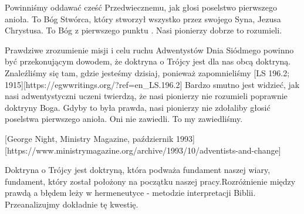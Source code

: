 Powinniśmy oddawać cześć Przedwiecznemu, jak głosi poselstwo pierwszego anioła. To Bóg Stwórca, który stworzył wszystko przez swojego Syna, Jezusa Chrystusa. To Bóg z pierwszego punktu . Nasi pionierzy dobrze to rozumieli.

Prawdziwe zrozumienie misji i celu ruchu Adwentystów Dnia Siódmego powinno być przekonującym dowodem, że doktryna o Trójcy jest dla nas obcą doktryną. Znaleźliśmy się tam, gdzie jesteśmy dzisiaj, ponieważ zapomnieliśmy [LS 196.2; 1915][https://egwwritings.org/?ref=en\_LS.196.2] Bardzo smutno jest widzieć, jak nasi adwentystyczni uczeni twierdzą, że nasi pionierzy nie rozumieli poprawnie doktryny Boga. Gdyby to była prawda, nasi pionierzy nie zdołaliby głosić poselstwa pierwszego anioła. Oni nie zawiedli. To my zawiedliśmy.

[George Night, Ministry Magazine, październik 1993][https://www.ministrymagazine.org/archive/1993/10/adventists-and-change]

Doktryna o Trójcy jest doktryną, która podważa fundament naszej wiary, fundament, który został położony na początku naszej pracy.Rozróżnienie między prawdą a błędem leży w hermeneutyce - metodzie interpretacji Biblii. Przeanalizujmy dokładnie tę kwestię.


